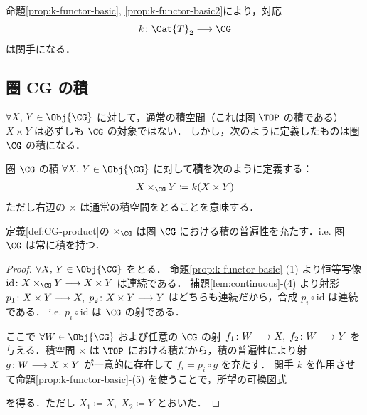 \documentclass[algtopo_main]{subfiles}
\begin{document}
命題\ref{prop:k-functor-basic}, \ref{prop:k-functor-basic2}により，対応
\begin{align}
    k \colon \Cat{T}_2 \lto \CG
\end{align}
は関手になる．



\subsection{圏 \textbf{CG} の積}

$\forall X,\, Y \in \Obj{\CG}$ に対して，通常の積空間（これは圏 $\TOP$ の積である）$X \times Y$ は必ずしも $\CG$ の対象ではない．
しかし，次のように定義したものは圏 $\CG$ の積になる．

\begin{mydef}[label=def:CG-product]{圏 $\CG$ の積}
    $\forall X,\, Y \in \Obj{\CG}$ に対して\textbf{積}を次のように定義する：
    \begin{align}
        X \times_{\CG} Y \coloneqq k(X \times Y)
    \end{align}
    ただし右辺の $\times$ は通常の積空間をとることを意味する．
\end{mydef}

\begin{myprop}[label=prop:CG-product-univ]{}
    定義\ref{def:CG-product}の $\times_{\CG}$ は圏 $\CG$ における積の普遍性を充たす．i.e. 圏 $\CG$ は常に積を持つ．
\end{myprop}

\begin{proof}
    $\forall X,\, Y \in \Obj{\CG}$ をとる．
    命題\ref{prop:k-functor-basic}-(1) より恒等写像 $\mathrm{id} \colon X \times_{\CG} Y \lto X \times Y$ は連続である．
    補題\ref{lem:continuous}-(4) より射影 $p_1 \colon X \times Y \longrightarrow X,\; p_2 \colon X \times Y \longrightarrow Y$ はどちらも連続だから，合成 $p_i  \circ \mathrm{id}$ は連続である．
    i.e. $p_i  \circ \mathrm{id}$ は $\CG$ の射である．
    
    ここで $\forall W \in \Obj{\CG}$ および任意の $\CG$ の射 $f_1 \colon W \longrightarrow X,\; f_2 \colon W \longrightarrow Y$ を与える．積空間 $\times$ は $\TOP$ における積だから，積の普遍性により射 $g \colon W \longrightarrow X \times Y$ が一意的に存在して $f_i = p_i \circ g$ を充たす．
    関手 $k$ を作用させて命題\ref{prop:k-functor-basic}-(5) を使うことで，所望の可換図式
    \begin{center}
    \end{center}
    を得る．ただし $X_1 \coloneqq X,\; X_2 \coloneqq Y$ とおいた．
\end{proof}
\end{document}
